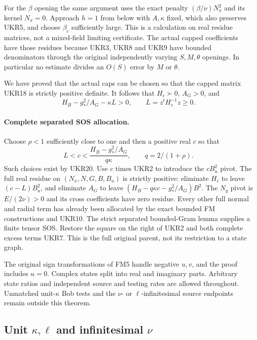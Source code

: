 For the $\beta$ opening the same argument uses the exact penalty
$(\beta/\nu)N_x^2$ and its kernel $N_x=0$. Approach $h=1$ from
below with $A,\kappa$ fixed, which also preserves UKR5, and choose
$\beta_c$ sufficiently large. This is a calculation on real
residue matrices, not a mixed-field limiting certificate. The
actual capped coefficients have those residues because UKR3,
UKR8 and UKR9 have bounded denominators through the original
independently varying $S,M,\theta$ openings. In particular no
estimate divides an $O(S)$ error by $M$ or $\theta$.

We have proved that the actual caps can be chosen so that the
capped matrix UKR18 is strictly positive definite. It follows
that $H_c\succ0$, $A_G>0$, and
\[
 H_B-g_*^2/A_G-\kappa L>0,\qquad L=z^tH_c^{-1}z\ge0.
 \tag{UKR20}
\]

\paragraph{Complete separated SOS allocation.}
Choose $\rho<1$ sufficiently close to one and then a positive
real $c$ so that
\[
 L<c<\frac{H_B-g_*^2/A_G}{q\kappa},\qquad q=2/(1+\rho).
 \tag{UKR21}
\]
Such choices exist by UKR20. Use $c$ times UKR2 to introduce
the $cB_u^2$ pivot. The full real residue on
$(N_x,N,G,B,B_u)$ is strictly positive: eliminate $H_c$ to
leave $(c-L)B_u^2$, and eliminate $A_G$ to leave
$(H_B-q\kappa c-g_*^2/A_G)B^2$.
The $N_y$ pivot is $E/(2\nu)>0$ and its cross coefficients
have zero residue. Every other full normal and radial term has
already been allocated by the exact bounded FM constructions
and UKR10. The strict separated bounded-Gram lemma supplies a
finite tensor SOS. Restore the square on the right of UKR2 and
both complete excess terms UKR7. This is the full original
parent, not its restriction to a state graph.

The original sign transformations of FM5 handle negative $u,v$,
and the proof includes $u=0$. Complex states split into real and
imaginary parts. Arbitrary state ratios and independent source
and testing rates are allowed throughout. Unmatched unit-$\kappa$
Bob tests and the $\nu$- or $\ell$-infinitesimal source endpoints
remain outside this theorem.



\subsection{Unit $\kappa,\ell$ and infinitesimal $\nu$}

